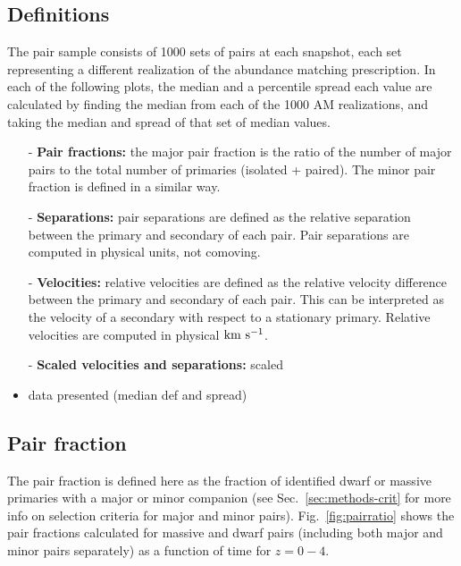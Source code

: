 \documentclass[twocolumn]{aastex631}
\begin{document}
\subsection{Definitions} \label{sec:results-defs}
    The pair sample consists of 1000 sets of pairs at each snapshot, each set representing a different realization of the abundance matching prescription. 
    In each of the following plots, the median and a percentile spread each value are calculated by finding the median from each of the 1000 AM realizations, and taking the median and spread of that set of median values.
    
    \begin{itemize}
        \item[-] \textbf{Pair fractions:} the major pair fraction is the ratio of the number of major pairs to the total number of primaries (isolated + paired). 
        The minor pair fraction is defined in a similar way. 

        \item[-] \textbf{Separations:} pair separations are defined as the relative separation between the primary and secondary of each pair. 
        Pair separations are computed in physical units, not comoving. 
        
        \item[-] \textbf{Velocities:} relative velocities are defined as the relative velocity difference between the primary and secondary of each pair. 
        This can be interpreted as the velocity of a secondary with respect to a stationary primary. 
        Relative velocities are computed in physical $\mathrm{km}~\mathrm{s}^{-1}$. 
        
        \item[-] \textbf{Scaled velocities and separations:} scaled 
        
        \item data presented (median def and spread)


    \end{itemize}



\subsection{Pair fraction}\label{sec:results-frac}
The pair fraction is defined here as the fraction of identified dwarf or massive primaries with a major or minor companion (see Sec.~\ref{sec:methods-crit} for more info on selection criteria for major and minor pairs). 
Fig.~\ref{fig:pairratio} shows the pair fractions calculated for massive and dwarf pairs (including both major and minor pairs separately) as a function of time for $z=0-4$. 
\end{document}
